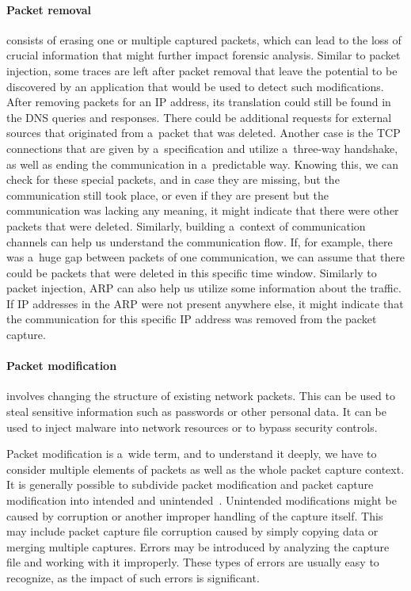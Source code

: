 \documentclass[
  printed,     %
  color,       %
  oneside,     %
  nosansbold,  %
  nocolorbold, %
  nolof,         %
  nolot,         %
]{fithesis4}
\begin{document}
\paragraph{Packet removal} consists of erasing one or multiple captured packets, which can lead to the loss of crucial information that might further impact forensic analysis. Similar to packet injection, some traces are left after packet removal that leave the potential to be discovered by an application that would be used to detect such modifications. After removing packets for an IP address, its translation could still be found in the DNS queries and responses. There could be additional requests for external sources that originated from a~packet that was deleted. Another case is the TCP connections that are given by a~specification and utilize a~three-way handshake, as well as ending the communication in a~predictable way. Knowing this, we can check for these special packets, and in case they are missing, but the communication still took place, or even if they are present but the communication was lacking any meaning, it might indicate that there were other packets that were deleted. Similarly, building a~context of communication channels can help us understand the communication flow. If, for example, there was a~huge gap between packets of one communication, we can assume that there could be packets that were deleted in this specific time window. Similarly to packet injection, ARP can also help us utilize some information about the traffic. If IP addresses in the ARP were not present anywhere else, it might indicate that the communication for this specific IP address was removed from the packet capture.

\paragraph{Packet modification} involves changing the structure of existing network packets. This can be used to steal sensitive information such as passwords or other personal data. It can be used to inject malware into network resources or to bypass security controls.

Packet modification is a~wide term, and to understand it deeply, we have to consider multiple elements of packets as well as the whole packet capture context. It is generally possible to subdivide packet modification and packet capture modification into intended and unintended~\cite{Howcanne5:online}. Unintended modifications might be caused by corruption or another improper handling of the capture itself. This may include packet capture file corruption caused by simply copying data or merging multiple captures. Errors may be introduced by analyzing the capture file and working with it improperly. These types of errors are usually easy to recognize, as the impact of such errors is significant. 
\end{document}
